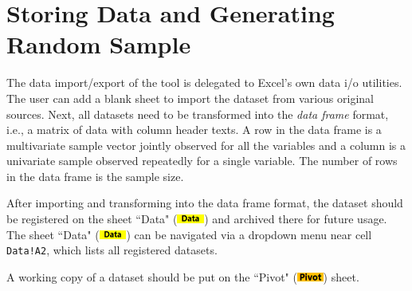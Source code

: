 \documentclass[article]{jss}
\numberwithin{equation}{subsection}
\newcommand{\shtData}{``Data" (\includegraphics[height=8pt, keepaspectratio=true]{img/DataSheetTab_png}) }
\newcommand{\shtPivot}{``Pivot" (\includegraphics[height=8pt, keepaspectratio=true]{img/PivotSheetTab_png}) }
\begin{document}
        \section[data]{Storing Data and Generating Random Sample}
        The data import/export of the tool is delegated to Excel's own data i/o utilities. The user can add a blank sheet to import the dataset from various original sources. Next, all datasets need to be transformed into the \textit{data frame} format, i.e., a matrix of data with column header texts. A row in the data frame is a multivariate sample vector jointly observed for all the variables and a column is a univariate sample observed repeatedly for a single variable. The number of rows in the data frame is the sample size.
        
        After importing and transforming into the data frame format, the dataset should be registered on the sheet \shtData and archived there for future usage. The sheet \shtData can be navigated via a dropdown menu near cell \texttt{Data!A2}, which lists all registered datasets. 
        
        A working copy of a dataset should be put on the \shtPivot sheet.
        
\end{document}
